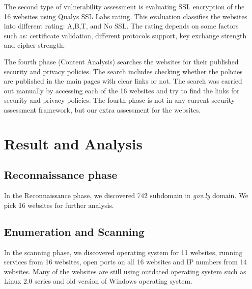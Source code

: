 \documentclass[conference]{IEEEtran}
\begin{document}
The second type of vulnerability assessment is evaluating SSL
encryption of the 16 websites using Qualys SSL Labs rating. This evaluation classifies the websites into different rating: A,B,T, and No
SSL. The rating depends on some factors such as: certificate validation,
different protocols support, key exchange strength and cipher strength.

The fourth phase (Content Analysis) searches the websites for their published security and 
privacy policies. The search
includes checking whether the policies are published in the main pages
with clear links or not. The search was carried out manually
by accessing each of the 16 websites and try to find the links for security and privacy policies. The fourth phase is not in any current security assessment framework, but our extra assessment for the websites.

\section{Result and Analysis} \label{sec:result}


\subsection{Reconnaissance phase}

In the Reconnaissance phase, we discovered 742 subdomain in \emph{gov.ly} domain. We pick 16 websites for further analysis.

\subsection{Enumeration and Scanning}

In the scanning phase, we discovered operating system for 11 websites, running services from 16 websites, open ports on all 16 websites and IP numbers from 14 websites. Many of the websites are still using outdated operating system such as Linux 2.0 series and old version of Windows operating system. 
\end{document}
